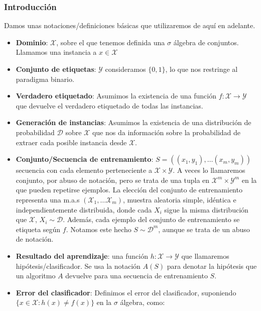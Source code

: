 

\subsubsection{Introducción}

Damos unas notaciones/definiciones básicas que utilizaremos de aquí en adelante.

\begin{itemize}
\item \textbf{Dominio}: $\mathcal{X}$, sobre el que tenemos definida una $\sigma$ álgebra de conjuntos. 
Llamamos una instancia a $x\in \mathcal{X}$
\item \textbf{Conjunto de etiquetas}: $\mathcal{Y}$ consideramos $\{0,1\}$, lo que nos restringe al paradigma binario.
\item \textbf{Verdadero etiquetado}: Asumimos la existencia de una función $f: \mathcal{X} \rightarrow \mathcal{Y}$ que devuelve el verdadero etiquetado de todas las instancias.
\item \textbf{Generación de instancias}: Asumimos la existencia de una distribución de probabilidad $\mathcal{D}$ sobre $\mathcal{X}$ que nos da información sobre la probabilidad de extraer cada posible instancia desde $\mathcal{X}$.
\item \textbf{Conjunto/Secuencia de entrenamiento}: $S = ((x_1,y_1), \ldots (x_m, y_m))$ secuencia con cada elemento perteneciente a $\mathcal{X}\times \mathcal{Y}$. A veces lo llamaremos conjunto, por abuso de notación, pero se trata de una tupla en $\mathcal{X}^m \times \mathcal{Y}^m$ en la que pueden repetirse ejemplos. La elección del conjunto de entrenamiento representa una m.a.s $(\mathcal{X}_1,\ldots \mathcal{X}_m)$, muestra aleatoria simple, idéntica e independientemente distribuida, donde cada $X_i$ sigue la misma distribución que $\mathcal{X}$, $X_i \sim \mathcal{D}$. Además, cada ejemplo del conjunto de entrenamiento se etiqueta según $f$. Notamos este hecho $S \sim \mathcal{D}^m$, aunque se trata de un abuso de notación.
\item \textbf{Resultado del aprendizaje}: una función $h: \mathcal{X} \rightarrow \mathcal{Y}$ que llamaremos hipótesis/clasificador. Se usa la notación $A(S)$ para denotar la hipótesis que un algoritmo $A$ devuelve para una secuencia de entrenamiento $S$.
\item \textbf{Error del clasificador}: Definimos el error del clasificador, suponiendo $\{x\in \mathcal{X} : h(x) \neq f(x)\}$ en la $\sigma$ álgebra, como:
\end{itemize}


